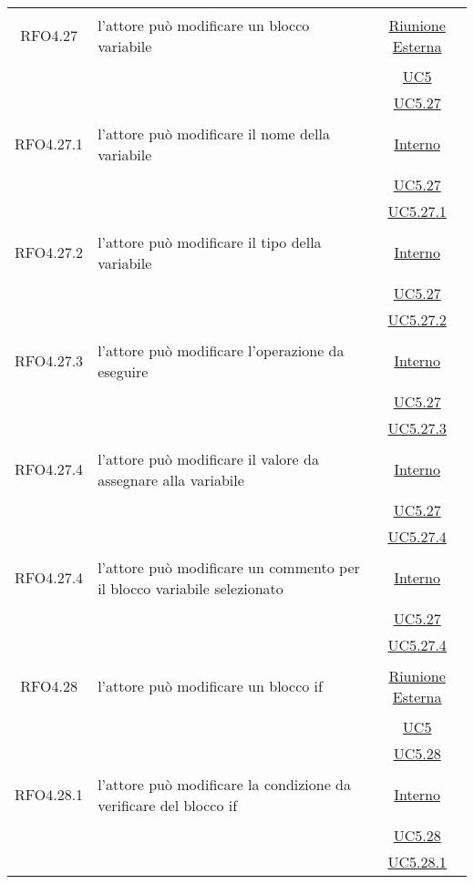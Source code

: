 \begin{longtable}{|c|>{\centering}m{7cm}|c|}
\hypertarget{RFO4.27}{RFO4.27} & l'attore può modificare un blocco variabile &  \hyperlink{Riunione Esterna}{Riunione Esterna}\\
& &\hyperref[UC5]{UC5}\\
& &\hyperref[UC5.27]{UC5.27}\\ \hline

\hypertarget{RFO4.27.1}{RFO4.27.1} & l'attore può modificare il nome della variabile & \hyperlink{Interno}{Interno}\\
& &\hyperref[UC5.27]{UC5.27}\\
& &\hyperref[UC5.27.1]{UC5.27.1}\\ \hline

\hypertarget{RFO4.27.2}{RFO4.27.2} & l'attore può modificare il tipo della variabile & \hyperlink{Interno}{Interno}\\
& &\hyperref[UC5.27]{UC5.27}\\
& &\hyperref[UC5.27.2]{UC5.27.2}\\ \hline

\hypertarget{RFO4.27.3}{RFO4.27.3} & l'attore può modificare l'operazione da eseguire & \hyperlink{Interno}{Interno}\\
& &\hyperref[UC5.27]{UC5.27}\\
& &\hyperref[UC5.27.3]{UC5.27.3}\\ \hline


\hypertarget{RFO4.27.4}{RFO4.27.4} & l'attore può modificare il valore da assegnare alla variabile &\hyperlink{Interno}{Interno}\\
& &\hyperref[UC5.27]{UC5.27}\\
& &\hyperref[UC5.27.4]{UC5.27.4}\\ \hline

\hypertarget{RFO4.27.4}{RFO4.27.4} & l'attore può modificare un commento per il blocco variabile selezionato&\hyperlink{Interno}{Interno}\\
& &\hyperref[UC5.27]{UC5.27}\\
& &\hyperref[UC5.27.4]{UC5.27.4}\\ \hline

\hypertarget{RFO4.28}{RFO4.28} & l'attore può modificare un blocco if & \hyperlink{Riunione Esterna}{Riunione Esterna}\\
& &\hyperref[UC5]{UC5}\\
& &\hyperref[UC5.28]{UC5.28}\\ \hline

\hypertarget{RFO4.28.1}{RFO4.28.1} & l'attore può modificare la condizione da verificare del blocco if & \hyperlink{Interno}{Interno}\\
& &\hyperref[UC5.28]{UC5.28}\\
& &\hyperref[UC5.28.1]{UC5.28.1}\\ \hline


\end{longtable}
